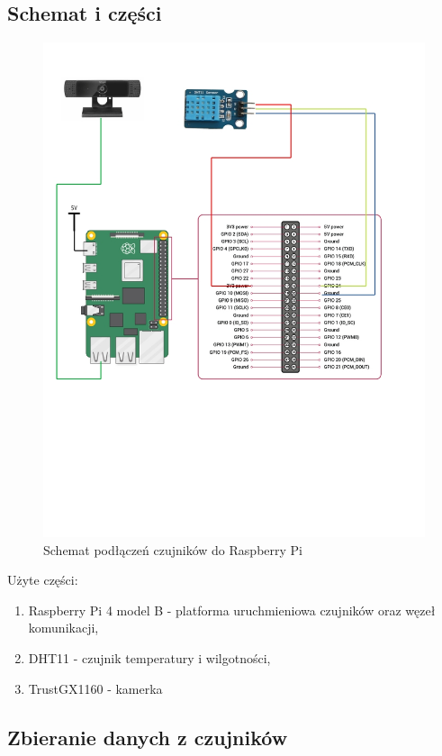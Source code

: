 \documentclass[runningheads]{llncs}
\begin{document}
\subsection{Schemat i części}
\begin{figure}
  \centering
  \includegraphics[width=\textwidth]{schemat.jpg}
\caption{Schemat podłączeń czujników do Raspberry Pi} \label{fig1}
\end{figure}
Użyte części:
\begin{enumerate}
\item Raspberry Pi 4 model B - platforma uruchmieniowa czujników oraz węzeł komunikacji,
\item DHT11 - czujnik temperatury i wilgotności,
\item TrustGX1160 - kamerka
\end{enumerate}

\subsection{Zbieranie danych z czujników}
\end{document}
